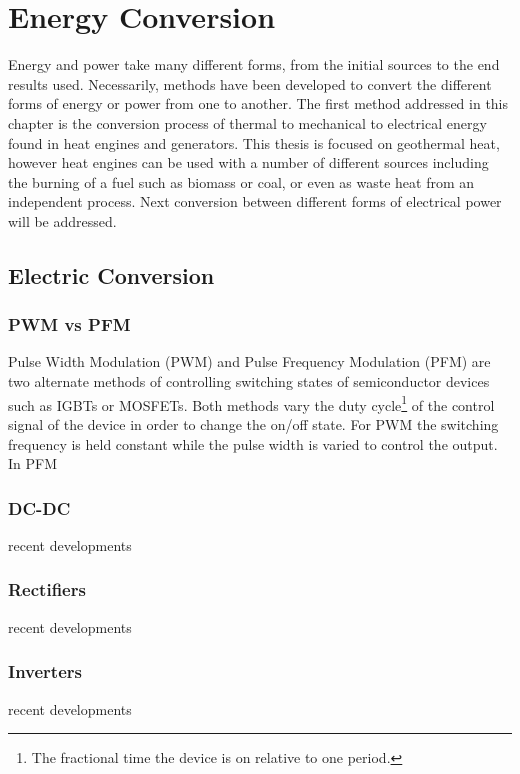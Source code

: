 \chapter{Energy Conversion}
\label{ch:conv}

Energy and power take many different forms, from the initial sources to the end results used. Necessarily, methods have been developed to convert the different forms of energy or power from one to another. The first method addressed in this chapter is the conversion process of thermal to mechanical to electrical energy found in heat engines and generators. This thesis is focused on geothermal heat, however heat engines can be used with a number of different sources including the burning of a fuel such as biomass or coal, or even as waste heat from an independent process. Next conversion between different forms of electrical power will be addressed.


\section{Electric Conversion}



\subsection{PWM vs PFM}
Pulse Width Modulation (PWM) and Pulse Frequency Modulation (PFM) are two alternate methods of controlling switching states of semiconductor devices such as IGBTs or MOSFETs. Both methods vary the duty cycle\footnote{The fractional time the device is on relative to one period.} of the control signal of the device in order to change the on/off state. For PWM the switching frequency is held constant while the pulse width is varied to control the output. In PFM 

\subsection{DC-DC}
recent developments

\subsection{Rectifiers}
recent developments

\subsection{Inverters}
recent developments
